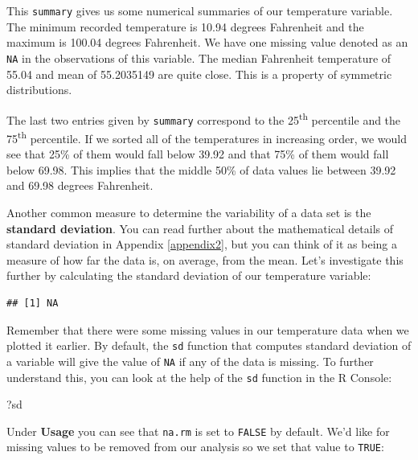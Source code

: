\documentclass[]{tufte-book}
\newenvironment{Shaded}{\begin{snugshade}}{\end{snugshade}}
\newcommand{\KeywordTok}[1]{\textcolor[rgb]{0.13,0.29,0.53}{\textbf{{#1}}}}
\newcommand{\NormalTok}[1]{{#1}}
\begin{document}
This \texttt{summary} gives us some numerical summaries of our
temperature variable. The minimum recorded temperature is 10.94 degrees
Fahrenheit and the maximum is 100.04 degrees Fahrenheit. We have one
missing value denoted as an \texttt{NA} in the observations of this
variable. The median Fahrenheit temperature of 55.04 and mean of
55.2035149 are quite close. This is a property of symmetric
distributions.

The last two entries given by \texttt{summary} correspond to the
25\textsuperscript{th} percentile and the 75\textsuperscript{th}
percentile. If we sorted all of the temperatures in increasing order, we
would see that 25\% of them would fall below 39.92 and that 75\% of them
would fall below 69.98. This implies that the middle 50\% of data values
lie between 39.92 and 69.98 degrees Fahrenheit.

Another common measure to determine the variability of a data set is the
\textbf{standard deviation}. You can read further about the mathematical
details of standard deviation in Appendix \ref{appendix2}, but you can
think of it as being a measure of how far the data is, on average, from
the mean. Let's investigate this further by calculating the standard
deviation of our temperature variable:

\begin{Shaded}
\end{Shaded}

\begin{verbatim}
## [1] NA
\end{verbatim}

Remember that there were some missing values in our temperature data
when we plotted it earlier. By default, the \texttt{sd} function that
computes standard deviation of a variable will give the value of
\texttt{NA} if any of the data is missing. To further understand this,
you can look at the help of the \texttt{sd} function in the R Console:

\begin{Shaded}
\begin{Highlighting}[]
\NormalTok{?sd}
\end{Highlighting}
\end{Shaded}

Under \textbf{Usage} you can see that \texttt{na.rm} is set to
\texttt{FALSE} by default. We'd like for missing values to be removed
from our analysis so we set that value to \texttt{TRUE}:
\end{document}
